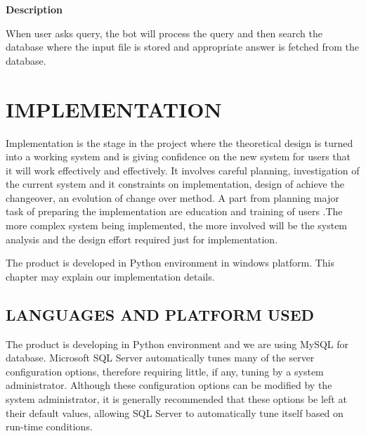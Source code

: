 \documentclass[12pt,a4paper,oneside]{report}
\begin{document}
        \textbf{Description}
        \\
        \par When user asks query, the bot will process the query and then search the database where
        the input file is stored and appropriate answer is fetched from the database.
 \chapter{IMPLEMENTATION}
 \par Implementation is the stage in the project where the theoretical design is turned into a working system and is giving conﬁdence on the new system for users that it will work effectively and effectively. It involves careful planning, investigation of the current system and it constraints on implementation, design of achieve the changeover, an evolution of change over method. A part from planning major task of preparing the implementation are education and training of users .The more complex system being implemented, the more involved will be the system analysis and the design effort required just for implementation.\\
 \par  The product is developed in Python environment in windows platform. This chapter may explain our implementation details.\\
 \section{ LANGUAGES AND PLATFORM USED}
\par The product is developing in Python environment and we are using MySQL for database. Microsoft SQL Server automatically tunes many of the server conﬁguration options, therefore requiring little, if any, tuning by a system administrator. Although these conﬁguration options can be modiﬁed by the system administrator, it is generally recommended that these options be left at their default values, allowing SQL Server to automatically tune itself based on run-time conditions.\\
\end{document}
